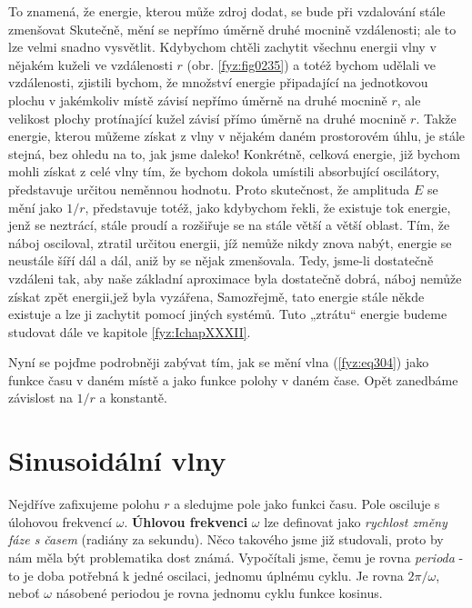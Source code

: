     To znamená, že energie, kterou může zdroj dodat, se bude při vzdalování stále zmenšovat 
    Skutečně, mění se nepřímo úměrně druhé mocnině vzdálenosti; ale to lze velmi snadno vysvětlit. 
    Kdybychom chtěli zachytit všechnu energii vlny v nějakém kuželi ve vzdálenosti \(r\) (obr. 
    \ref{fyz:fig0235}) a totéž bychom udělali ve vzdálenosti, zjistili bychom, že množství energie 
    připadající na jednotkovou plochu v jakémkoliv místě závisí nepřímo úměrně na druhé mocnině 
    \(r\), ale velikost plochy protínající kužel závisí přímo úměrně na druhé mocnině \(r\). Takže 
    energie, kterou můžeme získat z vlny v nějakém daném prostorovém úhlu, je stále stejná, bez 
    ohledu na to, jak jsme daleko! Konkrétně, celková energie, již bychom mohli získat z celé vlny 
    tím, že bychom dokola umístili absorbující oscilátory, představuje určitou neměnnou hodnotu. 
    Proto skutečnost, že amplituda \(E\) se mění jako \(1/r\), představuje totéž, jako kdybychom 
    řekli, že existuje tok energie, jenž se neztrácí, stále proudí a rozšiřuje se na stále větší a 
    větší oblast. Tím, že náboj osciloval, ztratil určitou energii, jíž nemůže nikdy znova nabýt, 
    energie se neustále šíří dál a dál, aniž by se nějak zmenšovala. Tedy, jsme-li dostatečně 
    vzdáleni tak, aby naše základní aproximace byla dostatečně dobrá, náboj nemůže získat zpět 
    energii,jež byla vyzářena, Samozřejmě, tato energie stále někde existuje a lze ji zachytit 
    pomocí jiných systémů. Tuto „ztrátu“ energie budeme studovat dále ve kapitole 
    \ref{fyz:IchapXXXII}.
    
    Nyní se pojďme podrobněji zabývat tím, jak se mění vlna (\ref{fyz:eq304}) jako funkce času v 
    daném místě a jako funkce polohy v daném čase. Opět zanedbáme závislost na \(1/r\) a konstantě.
    
  \section{Sinusoidální vlny}\label{fyz:IchapXXIXsecIII}
    Nejdříve zafixujeme polohu \(r\) a sledujme pole jako funkci času. Pole osciluje s úlohovou 
    frekvencí \(\omega\). \textbf{Úhlovou frekvenci} \(\omega\) lze definovat jako \emph{rychlost 
    změny fáze s časem} (radiány za sekundu). Něco takového jsme již studovali, proto by nám měla 
    být problematika dost známá. Vypočítali jsme, čemu je rovna \emph{perioda} - to je doba 
    potřebná k jedné oscilaci, jednomu úplnému cyklu. Je rovna \(2\pi/\omega\), neboť \(\omega\) 
    násobené periodou je rovna jednomu cyklu funkce kosinus.
    
